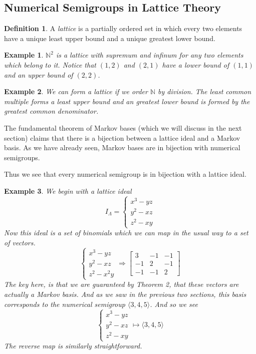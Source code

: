\documentclass[11pt]{amsart}
\theoremstyle{plain}
\newtheorem{exa}{Example}
\theoremstyle{definition}
\newtheorem{defi}{Definition}
\begin{document}
\subsection{Numerical Semigroups in Lattice Theory}
\begin{defi}
\cite{stanley}
A \emph{lattice} is a partially ordered set in which every two elements have a
unique least upper bound and a unique greatest lower bound.
\end{defi}
\begin{exa}
$\mathbb{N}^2$ is a lattice with supremum and infinum for any two elements which
belong to it. Notice that $(1,2)$ and $(2,1)$ have a lower bound of $(1,1)$ and
an upper bound of $(2,2)$.
\end{exa}
\begin{exa}
We can form a lattice if we order $\mathbb{N}$ by division. The least common
multiple forms a least upper bound and an greatest lower bound is formed by the
greatest common denominator.
\end{exa}
The fundamental theorem of Markov bases (which we will discuss in the next section)
claims that there is a bijection between a lattice ideal and a Markov basis. As
we have already seen, Markov bases are in bijection with numerical semigroups.

Thus we see that every numerical semigroup is in bijection with a lattice ideal.

\begin{exa}
  We begin with a lattice ideal
  \[
  I_\Lambda=
  \begin{cases}
    x^3-yz\\
    y^2-xz\\
    z^2-xy
  \end{cases}
  \]
  Now this ideal is a set of binomials which we can map in the usual way to a set
  of vectors.
  \[
  \begin{cases}
    x^3-yz\\
    y^2-xz\\
    z^2-x^2y
  \end{cases}
  \Rightarrow
  \left[\begin{array}{rrr}
    3&-1&-1\\
    -1&2&-1\\
    -1&-1&2
  \end{array}\right]
  \]
  The key here, is that we are guaranteed by Theorem 2, that these vectors are
  actually a Markov basis. And as we saw in the previous two sections, this basis
  corresponds to the numerical semigroup $\langle 3,4,5\rangle$. And so we see
  \[
  \begin{cases}
    x^3-yz\\
    y^2-xz\\
    z^2-xy
  \end{cases}
  \mapsto\langle 3,4,5\rangle
  \]
  The reverse map is similarly straightforward.
\end{exa}
\end{document}
